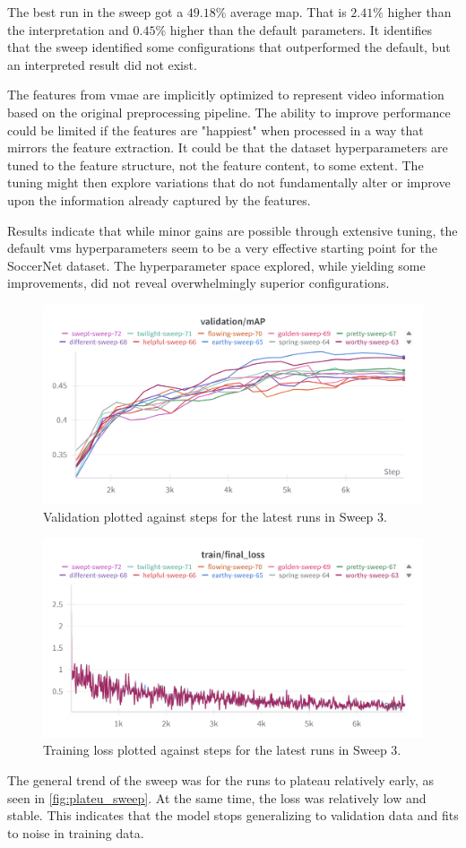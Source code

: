 The best run in the sweep got a $49.18\%$ average \acrshort{map}. That is $2.41\%$ higher than the interpretation and $0.45\%$ higher than the default parameters. It identifies that the sweep identified some configurations that outperformed the default, but an interpreted result did not exist. 



The features from \acrshort{vmae} are implicitly optimized to represent video information based on the original preprocessing pipeline. The ability to improve performance could be limited if the features are "happiest" when processed in a way that mirrors the feature extraction. It could be that the dataset hyperparameters are tuned to the feature structure, not the feature content, to some extent. The tuning might then explore variations that do not fundamentally alter or improve upon the information already captured by the features. 

Results indicate that while minor gains are possible through extensive tuning, the default \acrshort{vms} hyperparameters seem to be a very effective starting point for the SoccerNet dataset. The hyperparameter space explored, while yielding some improvements, did not reveal overwhelmingly superior configurations.


\begin{figure}
    \centering
    \includegraphics[width=0.75\linewidth]{figures/plateu_sweep.png}
    \caption{Validation plotted against steps for the latest runs in Sweep 3. }
    \label{fig:plateu_sweep}
\end{figure}
\begin{figure}
    \centering
    \includegraphics[width=0.75\linewidth]{figures/plateu_loss.png}
    \caption{Training loss plotted against steps for the latest runs in Sweep 3.}
    \label{fig:plateu_loss}
\end{figure}
The general trend of the sweep was for the runs to plateau relatively early, as seen in \autoref{fig:plateu_sweep}. At the same time, the loss was relatively low and stable. This indicates that the model stops generalizing to validation data and fits to noise in training data.


